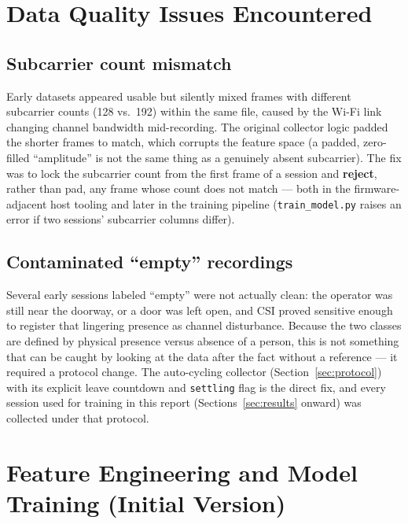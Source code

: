 \documentclass[11pt,a4paper]{article}
\begin{document}
\section{Data Quality Issues Encountered}

\subsection{Subcarrier count mismatch}
\label{sec:subcarrier-bug}

Early datasets appeared usable but silently mixed frames with different
subcarrier counts (128 vs.\ 192) within the same file, caused by the
Wi-Fi link changing channel bandwidth mid-recording. The original
collector logic padded the shorter frames to match, which corrupts the
feature space (a padded, zero-filled ``amplitude'' is not the same
thing as a genuinely absent subcarrier). The fix was to lock the
subcarrier count from the first frame of a session and \textbf{reject},
rather than pad, any frame whose count does not match --- both in the
firmware-adjacent host tooling and later in the training pipeline
(\texttt{train\_model.py} raises an error if two sessions' subcarrier
columns differ).

\subsection{Contaminated ``empty'' recordings}
\label{sec:contaminated-empty}

Several early sessions labeled ``empty'' were not actually clean: the
operator was still near the doorway, or a door was left open, and CSI
proved sensitive enough to register that lingering presence as channel
disturbance. Because the two classes are defined by physical presence
versus absence of a person, this is not something that can be caught by
looking at the data after the fact without a reference --- it required
a protocol change. The auto-cycling collector
(Section~\ref{sec:protocol}) with its explicit leave countdown and
\texttt{settling} flag is the direct fix, and every session used for
training in this report (Sections~\ref{sec:results}
onward) was collected under that protocol.

\section{Feature Engineering and Model Training (Initial Version)}
\label{sec:initial-model}
\end{document}
